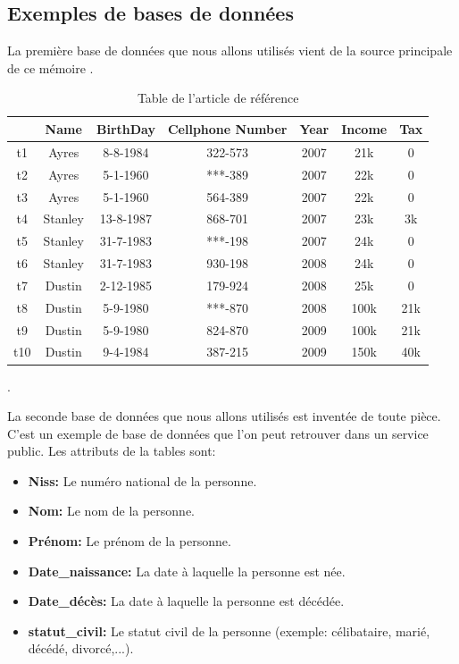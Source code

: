 \documentclass[letterpaper, 12pt]{report}
\begin{document}
\subsection{Exemples de bases de données}

La première base de données que nous allons utilisés vient de la source principale de ce mémoire \cite{main}.

\begin{table}[H]
	\centering
	\begin{tabular}{|c|c c c c c c|}
	\hline
	    & Name & BirthDay & Cellphone Number & Year & Income & Tax\\
	\hline
	 t1 & Ayres & 8-8-1984 & 322-573 & 2007 & 21k & 0\\
	 t2 & Ayres & 5-1-1960 & ***-389 & 2007 & 22k & 0 \\
	 t3 & Ayres & 5-1-1960 & 564-389 & 2007 & 22k & 0 \\
	 t4 & Stanley & 13-8-1987 & 868-701 & 2007 & 23k & 3k\\
	 t5 & Stanley & 31-7-1983 & ***-198 & 2007 & 24k & 0\\
	 t6 & Stanley & 31-7-1983 & 930-198 & 2008 & 24k & 0\\
	 t7 & Dustin & 2-12-1985 & 179-924 & 2008 & 25k & 0 \\
	 t8 & Dustin & 5-9-1980 & ***-870 & 2008 & 100k & 21k \\
	 t9 & Dustin & 5-9-1980 & 824-870 & 2009 & 100k & 21k \\
	 t10 & Dustin & 9-4-1984 & 387-215 & 2009 & 150k & 40k \\
	 \hline
	\end{tabular}
	\caption{\label{tableMain} Table de l'article de référence}.
\end{table}

La seconde base de données que nous allons utilisés est inventée de toute pièce. C'est un exemple de base de données que l'on peut retrouver dans un service public.
Les attributs de la tables sont:
\begin{itemize}
\item \textbf{Niss:} Le numéro national de la personne.
\item \textbf{Nom:} Le nom de la personne.
\item \textbf{Prénom:} Le prénom de la personne.
\item \textbf{Date\_naissance:} La date à laquelle la personne est née.
\item \textbf{Date\_décès:} La date à laquelle la personne est décédée.
\item \textbf{statut\_civil:} Le statut civil de la personne (exemple: célibataire, marié, décédé, divorcé,...).
\end{itemize}
\end{document}
